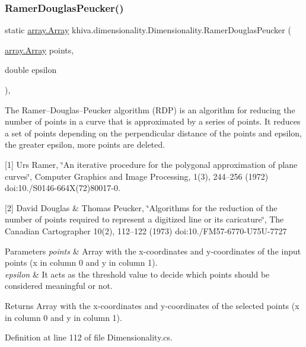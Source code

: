 \subsubsection{\texorpdfstring{Ramer\+Douglas\+Peucker()}{RamerDouglasPeucker()}}
{\footnotesize\ttfamily static \mbox{\hyperlink{classkhiva_1_1array_1_1_array}{array.\+Array}} khiva.\+dimensionality.\+Dimensionality.\+Ramer\+Douglas\+Peucker (\begin{DoxyParamCaption}\item[{\mbox{\hyperlink{classkhiva_1_1array_1_1_array}{array.\+Array}}}]{points,  }\item[{double}]{epsilon }\end{DoxyParamCaption})\hspace{0.3cm}{\ttfamily [inline]}, {\ttfamily [static]}}



The Ramer–\+Douglas–\+Peucker algorithm (R\+DP) is an algorithm for reducing the number of points in a curve that is approximated by a series of points. It reduces a set of points depending on the perpendicular distance of the points and epsilon, the greater epsilon, more points are deleted. 

\mbox{[}1\mbox{]} Urs Ramer, \char`\"{}\+An iterative procedure for the polygonal approximation of plane curves\char`\"{}, Computer Graphics and Image Processing, 1(3), 244–256 (1972) doi\+:10./\+S0146-\/664X(72)80017-\/0.

\mbox{[}2\mbox{]} David Douglas \& Thomas Peucker, \char`\"{}\+Algorithms for the reduction of the number of points required to represent a
digitized line or its caricature\char`\"{}, The Canadian Cartographer 10(2), 112–122 (1973) doi\+:10./\+F\+M57-\/6770-\/\+U75\+U-\/7727 


\begin{DoxyParams}{Parameters}
{\em points} & Array with the x-\/coordinates and y-\/coordinates of the input points (x in column 0 and y in column 1).\\
\hline
{\em epsilon} & It acts as the threshold value to decide which points should be considered meaningful or not.\\
\hline
\end{DoxyParams}
\begin{DoxyReturn}{Returns}
Array with the x-\/coordinates and y-\/coordinates of the selected points (x in column 0 and y in column 1).
\end{DoxyReturn}


Definition at line 112 of file Dimensionality.\+cs.


